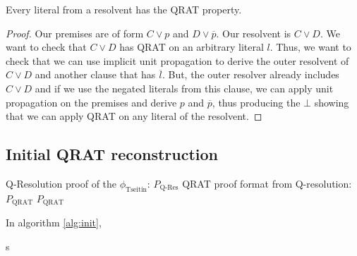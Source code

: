 \begin{claim}\label{qrat:resolvent}
    Every literal from a resolvent has the QRAT property.
\end{claim}

\begin{proof}
    Our premises are of form $C \lor p$ and $D \lor \overline{p}$. Our resolvent is $C \lor D$. We want to check that $C \lor D$ has QRAT on an arbitrary literal $l$. Thus, we want to check that we can use implicit unit propagation to derive the outer resolvent of $C \lor D$ and another clause that has $\overline{l}$. But, the outer resolver already includes $C \lor D$ and if we use the negated literals from this clause, we can apply unit propagation on the premises and derive $p$ and $\overline{p}$, thus producing the $\bot$ showing that we can apply QRAT on any literal of the resolvent.
\end{proof}

\subsection{Initial QRAT reconstruction}\label{qrat:init}

\begin{algorithm}[H]
\caption{QRAT proof for a QBF from its QCIR.}\label{alg:init}
\begin{algorithmic}[1]
\Require Q-Resolution proof of the $\phi_\text{Tseitin}$: $P_\text{Q-Res}$
\Ensure QRAT proof format from Q-resolution: $P_\text{QRAT}$
\State \Return $P_\text{QRAT}$
\EndProcedure
\end{algorithmic}
\end{algorithm}

In algorithm \ref{alg:init}, 

\begin{claim}
    s
\end{claim}
